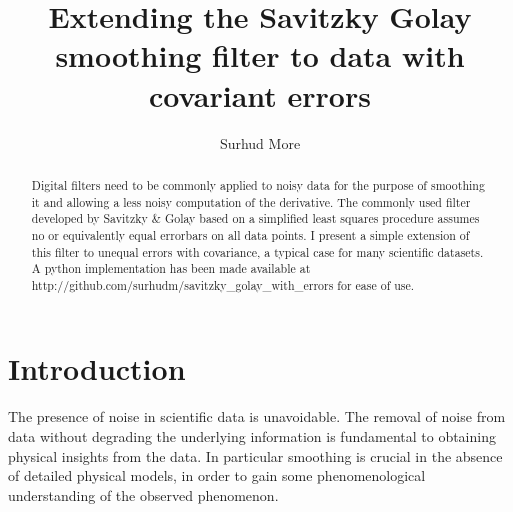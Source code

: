 \documentclass[iop, apj, onecolumn]{emulateapj}
\begin{document}


\title{Extending the Savitzky Golay smoothing filter to data with covariant
errors}
\author{
Surhud More 
}



\begin{abstract}
Digital filters need to be commonly applied to noisy data for the purpose of
smoothing it and allowing a less noisy computation of the derivative. The
commonly used filter developed by Savitzky \& Golay based on a simplified least
squares procedure assumes no or equivalently equal errorbars on all data points.
I present a simple extension of this filter to unequal errors with covariance, a
typical case for many scientific datasets. A python implementation has been made
available at http://github.com/surhudm/savitzky\_golay\_with\_errors for ease of
use.
\end{abstract}

\keywords{}


\section{Introduction}
\label{sec:intro}

The presence of noise in scientific data is unavoidable. The removal of noise
from data without degrading the underlying information is fundamental to
obtaining physical insights from the data. In particular smoothing is crucial in
the absence of detailed physical models, in order to gain some phenomenological
understanding of the observed phenomenon. 
\end{document}
